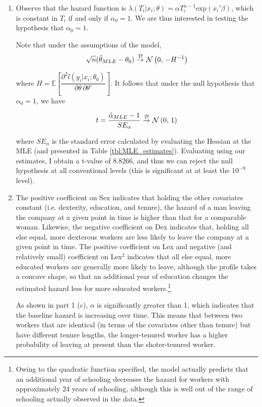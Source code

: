 \documentclass[]{report}
\newcommand{\0}{\bv{0}}
\newcommand{\1}{\bv{1}}
\newcommand{\parens}[1]{\left(#1\right)}
\newcommand{\bracks}[1]{\left[#1\right]}
\newcommand{\expe}[1]{\mathbb{E}\bracks{#1}}
\renewcommand{\exp}[1]{\mathrm{exp}\parens{#1}}
\newcommand{\partialdtwo}[3]{ \dfrac{\partial^2 #1}{\partial #2 \, \partial #3}}
\newcommand{\normnot}[2]{\mathcal{N}\parens{#1,\,#2}}
\newcommand{\convd}{~{\buildrel \mathcal{D} \over \rightarrow}~}
\begin{document}
\begin{enumerate}[1.]
\begin{enumerate}
\item
Observe that the hazard function is $\lambda(T_i|x_i;\theta) = \alpha T_i^{\alpha-1} \exp{x_i' \beta}$, which is constant in $T_i$ if and only if $\alpha_0 = 1$. We are thus interested in testing the hypothesis that $\alpha_0 = 1$. 

Note that under the assumptions of the model,
\begin{align}
\sqrt{n} (\hat{\theta}_{MLE} - \theta_0) \convd \normnot{0}{-H^{-1}}
\end{align}

where $H = \expe{\partialdtwo{l(y_i|x_i; \theta_0)}{\theta}{\theta'}}$. It follows that under the null hypothesis that $\alpha_0 = 1$, we have

\begin{align}
	t = \dfrac{\hat{\alpha}_{MLE} - 1}{SE_{\alpha}} \convd \normnot{0}{1}
\end{align}

where $SE_{\alpha}$ is the standard error calculated by evaluating the Hessian at the MLE (and presented in Table \ref{tbl:MLE_estimates}). Evaluating using our estimates, I obtain a t-value of $8.8266$, and thus we can reject the null hypothesis at all conventional levels (this is significant at at least the $10^{-9}$ level).

\item

The positive coefficient on Sex indicates that holding the other covariates constant (i.e. dexterity, education, and tenure), the hazard of a man leaving the company at a given point in time is higher than that for a comparable woman. Likewise, the negative coefficient on Dex indicates that, holding all else equal, more dexterous workers are less likely to leave the company at a given point in time. The positive coefficient on Lex and negative (and relatively small) coefficient on Lex$^2$ indicates that all else equal, more educated workers are generally more likely to leave, although the profile takes a concave shape, so that an additional year of education changes the estimated hazard less for more educated workers.\footnote{Owing to the quadratic function specified, the model actually predicts that an additional year of schooling decreases the hazard for workers with approximately 24 years of schooling, although this is well out of the range of schooling actually observed in the data.}

As shown in part 1 (c), $\alpha$ is significantly greater than 1, which indicates that the baseline hazard is increasing over time. This means that between two workers that are identical (in terms of the covariates other than tenure) but have different tenure lengths, the longer-tenured worker has a higher probability of leaving at present than the shoter-tenured worker.



\end{enumerate}
\end{enumerate}
\end{document}
